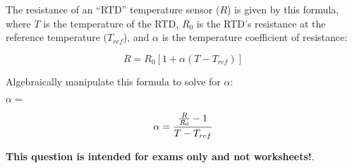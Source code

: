

The resistance of an ``RTD'' temperature sensor ($R$) is given by this formula, where $T$ is the temperature of the RTD, $R_0$ is the RTD's resistance at the reference temperature ($T_{ref}$), and $\alpha$ is the temperature coefficient of resistance:
 
$$R = R_0 [1 + \alpha (T - T_{ref})]$$

Algebraically manipulate this formula to solve for $\alpha$:

\vskip 20pt

$\alpha = $







$$\alpha = {{{R \over R_0} - 1} \over {T - T_{ref}}}$$







{\bf This question is intended for exams only and not worksheets!}.



